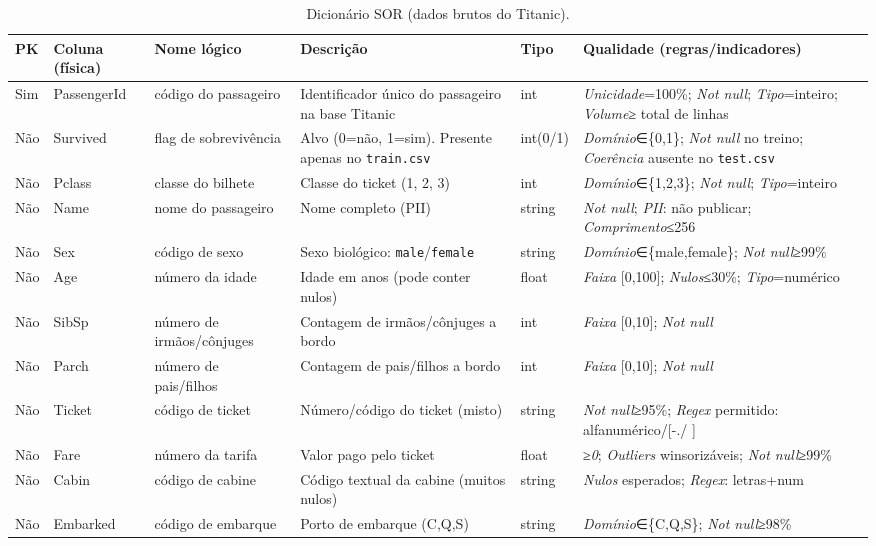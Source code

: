 \documentclass[12pt,a4paper]{article}
\begin{document}
\begin{table}[h!]
\centering
\footnotesize
\begin{tabular}{@{}llp{3cm}p{5.5cm}lp{6.3cm}@{}}
\toprule
\textbf{PK} & \textbf{Coluna (física)} & \textbf{Nome lógico} & \textbf{Descrição} & \textbf{Tipo} & \textbf{Qualidade (regras/indicadores)} \\
\midrule
Sim  & PassengerId & código do passageiro & Identificador único do passageiro na base Titanic & int & \textit{Unicidade}=100\%; \textit{Not null}; \textit{Tipo}=inteiro; \textit{Volume}≥ total de linhas \\
Não  & Survived    & flag de sobrevivência & Alvo (0=não, 1=sim). Presente apenas no \texttt{train.csv} & int(0/1) & \textit{Domínio}∈\{0,1\}; \textit{Not null} no treino; \textit{Coerência} ausente no \texttt{test.csv} \\
Não  & Pclass      & classe do bilhete    & Classe do ticket (1, 2, 3) & int & \textit{Domínio}∈\{1,2,3\}; \textit{Not null}; \textit{Tipo}=inteiro \\
Não  & Name        & nome do passageiro   & Nome completo (PII) & string & \textit{Not null}; \textit{PII}: não publicar; \textit{Comprimento}≤256 \\
Não  & Sex         & código de sexo       & Sexo biológico: \texttt{male}/\texttt{female} & string & \textit{Domínio}∈\{male,female\}; \textit{Not null}≥99\% \\
Não  & Age         & número da idade      & Idade em anos (pode conter nulos) & float & \textit{Faixa} [0,100]; \textit{Nulos}≤30\%; \textit{Tipo}=numérico \\
Não  & SibSp       & número de irmãos/cônjuges & Contagem de irmãos/cônjuges a bordo & int & \textit{Faixa} [0,10]; \textit{Not null} \\
Não  & Parch       & número de pais/filhos & Contagem de pais/filhos a bordo & int & \textit{Faixa} [0,10]; \textit{Not null} \\
Não  & Ticket      & código de ticket     & Número/código do ticket (misto) & string & \textit{Not null}≥95\%; \textit{Regex} permitido: alfanumérico/[-./ ] \\
Não  & Fare        & número da tarifa     & Valor pago pelo ticket & float & \textit{≥0}; \textit{Outliers} winsorizáveis; \textit{Not null}≥99\% \\
Não  & Cabin       & código de cabine     & Código textual da cabine (muitos nulos) & string & \textit{Nulos} esperados; \textit{Regex}: letras+num \\
Não  & Embarked    & código de embarque   & Porto de embarque (C,Q,S) & string & \textit{Domínio}∈\{C,Q,S\}; \textit{Not null}≥98\% \\
\bottomrule
\end{tabular}
\caption{Dicionário SOR (dados brutos do Titanic).}
\end{table}
\end{document}
